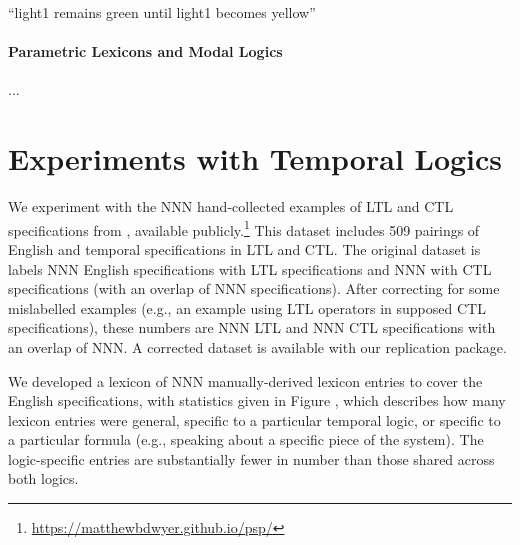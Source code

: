 \documentclass[11pt,a4paper,acceptedWithA]{article}
\begin{document}
``light1 remains green until light1 becomes yellow''


\paragraph{Parametric Lexicons and Modal Logics}
...

\section{Experiments with Temporal Logics}
We experiment with the NNN hand-collected examples of \textsc{LTL} and \textsc{CTL} specifications from \citet{dwyer1999patterns}, available publicly.\footnote{\url{https://matthewbdwyer.github.io/psp/}}
This dataset includes 509 pairings of English and temporal specifications in \textsc{LTL} and \textsc{CTL}.
The original dataset is labels NNN English specifications with \textsc{LTL} specifications and NNN with \textsc{CTL} specifications (with an overlap of NNN specifications). After correcting for some mislabelled examples (e.g., an example using \textsc{LTL} operators in supposed \textsc{CTL} specifications), these numbers are NNN \textsc{LTL} and NNN \textsc{CTL} specifications with an overlap of NNN. A corrected dataset is available with our replication package.

We developed a lexicon of NNN manually-derived lexicon entries to cover the English specifications, with statistics given in Figure , which describes how many lexicon entries were general, specific to a particular temporal logic, or specific to a particular formula (e.g., speaking about a specific piece of the system). The logic-specific entries are substantially fewer in number than those shared across both logics.

\end{document}
